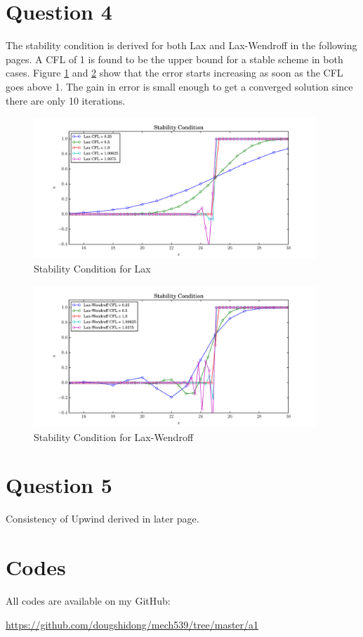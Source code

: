 \documentclass[letterpaper,12pt,]{article}
\begin{document}
\newpage
\section*{Question 4}

The stability condition is derived for both Lax and Lax-Wendroff in the following pages.
A CFL of 1 is found to be the upper bound for a stable scheme in both cases.
Figure \ref{fig:q41} and \ref{fig:q42} show that the error starts increasing as soon as the CFL goes above 1.
The gain in error is small enough to get a converged solution since there are only 10 iterations.
\begin{figure}[!h]
    \centering
    \includegraphics[width = 0.95\textwidth]{./Figures/q4_1}
    \caption{Stability Condition for Lax}
    \label{fig:q41}
\end{figure}
\begin{figure}[!h]
    \centering
    \includegraphics[width = 0.95\textwidth]{./Figures/q4_2}
    \caption{Stability Condition for Lax-Wendroff}
    \label{fig:q42}
\end{figure}



\section*{Question 5}

Consistency of Upwind derived in later page.

\section*{Codes}

All codes are available on my GitHub:

\url{https://github.com/dougshidong/mech539/tree/master/a1}


\end{document}
